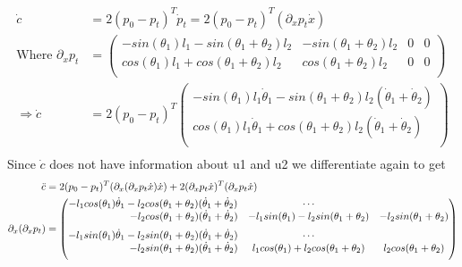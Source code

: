 \begin{enumerate}
  \begin{align*}
  \dot c &= 2{(p_0-p_t)}^T \dot p_t  = 2{(p_0-p_t)}^T (\partial_x{p_t} \dot x) \\
  \mbox{Where } \partial_x p_t &= \begin{pmatrix}
                                  -sin(\theta_1)l_1 - sin(\theta_1 + \theta_2) l_2 & - sin(\theta_1 + \theta_2) l_2 & 0 & 0\\
                                  cos(\theta_1)l_1 + cos(\theta_1 + \theta_2) l_2 & cos(\theta_1 + \theta_2) l_2 & 0 & 0\\
                                 \end{pmatrix}\\
  \Rightarrow  \dot c &= 2(p_0 - p_t)^T \begin{pmatrix}
                                  -sin(\theta_1)l_1 \dot \theta_1 - sin(\theta_1 + \theta_2) l_2 (\dot \theta_1 + \dot \theta_2)\\
                                  cos(\theta_1)l_1 \dot \theta_1 + cos(\theta_1 + \theta_2) l_2 (\dot \theta_1 + \dot \theta_2)\\
                                       \end{pmatrix}\\
  \end{align*}
  Since $\dot c$  does not have information about u1 and u2 we differentiate again to get 
  \begin{align*}
   \ddot c &= 2(p_0 - p_t)^T(\partial_x(\partial_x p_t \dot x) \dot x) + 2 (\partial_x p_t \dot x)^T (\partial_x p_t \dot x)\\ 
  \partial_x(\partial_x p_t) &= \begin{pmatrix}
				    -l_1 cos(\theta_1) \dot \theta_1 - l_2 cos(\theta_1 + \theta_2)(\dot \theta_1 +
\dot \theta_2)& \cdots \\
 \hfill -l_2 cos(\theta_1 + \theta_2)  (\dot \theta_1 + \dot \theta_2) & -l_1 sin(\theta_1) -l_2sin(\theta_1 +
\theta_2) & -l_2sin(\theta_1+ \theta_2)\\[6pt]
                                  -l_1 sin(\theta_1) \dot \theta_1 - l_2 sin(\theta_1 + \theta_2)(\dot \theta_1 + \dot \theta_2)
& \cdots\\ 
\hfill -l_2 sin(\theta_1 + \theta_2)  (\dot \theta_1 + \dot \theta_2) &  l_1 cos(\theta_1) +  l_2cos(\theta_1 + \theta_2)
& l_2cos(\theta_1 + \theta_2)\\[6pt]
                                 \end{pmatrix}\\

\end{align*}
\end{enumerate}
